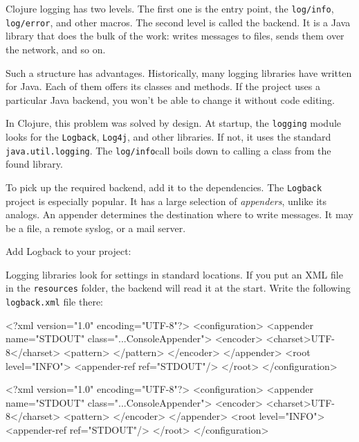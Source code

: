 Clojure logging has two levels. The first one is the entry point, the \verb|log/info|, \verb|log/error|, and other macros. The second level is called the backend. It is a Java library that does the bulk of the work: writes messages to files, sends them over the network, and so on.

Such a structure has advantages. Historically, many logging libraries have written for Java. Each of them offers its classes and methods. If the project uses a particular Java backend, you won't be able to change it without code editing.


In Clojure, this problem was solved by design. At startup, the \verb|logging| module looks for the \verb|Logback|, \verb|Log4j|, and other libraries. If not, it uses the standard \verb|java.util.logging|. The \verb|log/info|call boils down to calling a class from the found library.

To pick up the required backend, add it to the dependencies. The \verb|Logback| project is especially popular. It has a large selection of \emph{appenders}, unlike its analogs. An appender determines the destination where to write messages. It may be a file, a remote syslog, or a mail server.

Add Logback to your project:

\begin{clojure}
\end{clojure}


Logging libraries look for settings in standard locations. If you put an XML file in the \verb|resources| folder, the backend will read it at the start. Write the following \verb|logback.xml| file there:

\ifx\DEVICETYPE\MOBILE

\begin{xml}
<?xml version="1.0" encoding="UTF-8"?>
<configuration>
  <appender name="STDOUT"
    class="...ConsoleAppender">
    <encoder>
      <charset>UTF-8</charset>
      <pattern>
      </pattern>
    </encoder>
  </appender>
  <root level="INFO">
    <appender-ref ref="STDOUT"/>
  </root>
</configuration>
\end{xml}

\else

\begin{xml}
<?xml version="1.0" encoding="UTF-8"?>
<configuration>
  <appender name="STDOUT" class="...ConsoleAppender">
    <encoder>
      <charset>UTF-8</charset>
      <pattern>%
    </encoder>
  </appender>
  <root level="INFO">
    <appender-ref ref="STDOUT"/>
  </root>
</configuration>
\end{xml}

